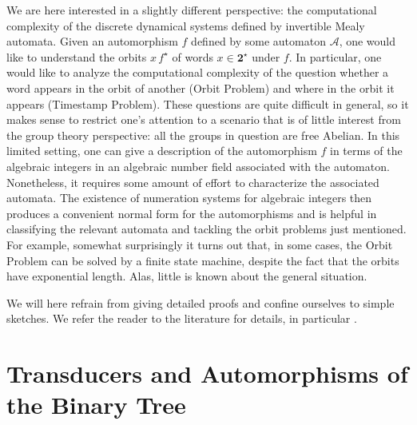 \documentclass[12pt]{svmult}
\def\2{\mathbf{2}}
\def\SS{\Star{\2}}
\def\cA{\mathcal{A}}
\providecommand{\Star}[1]{{#1}^{\star}}
\begin{document}
We are here interested in a slightly different perspective: the computational complexity 
of the discrete dynamical systems defined by invertible Mealy automata. 
Given an automorphism $f$ defined by some automaton $\cA$, one would like to understand the orbits
$x \, \Star{f}$ of words $x \in \SS$ under $f$. 
In particular, one would like to analyze the computational complexity of the 
question whether a word appears in the orbit of another (Orbit Problem)
and where in the orbit it appears (Timestamp Problem). 
These questions are quite difficult in general, so it makes sense to restrict 
one's attention to a scenario that is of little interest from the group theory 
perspective: all the groups in question are free Abelian. 
In this limited setting, one can give a description of the automorphism $f$ in terms 
of the algebraic integers in an algebraic number field associated with the automaton.
Nonetheless, it requires some amount of effort to characterize the associated automata. 
The existence of numeration systems for algebraic integers then produces a convenient
normal form for the automorphisms and is helpful in classifying the relevant automata 
and tackling the orbit problems just mentioned. 
For example, somewhat surprisingly it turns out that, in some cases, the Orbit Problem 
can be solved by a finite state machine, despite the fact that the orbits have exponential length. 
Alas, little is known about the general situation.

We will here refrain from giving detailed proofs and confine ourselves to simple 
sketches.  We refer the reader to the literature for details, in particular 
\cite{Nekrashevych05:self_similar_groups,GrigorchukNS00:automata_groups,%
Sidki00:one_rooted_trees,Sutner13:invertible_iteration,Sutner13:iteration_ijfcs,SutnerLewi12:ibiv_jalc,%
Okano15:thesis}.

\section{Transducers and Automorphisms of the Binary Tree}
\label{sec:terminology}
\end{document}
